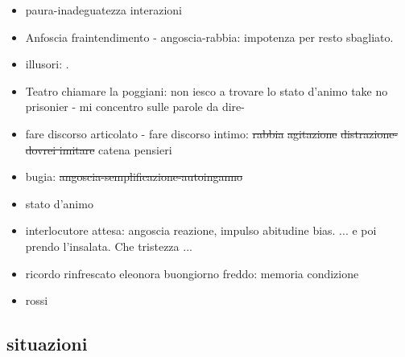 \begin{itemize}

\item paura-inadeguatezza interazioni

\item Anfoscia fraintendimento - angoscia-rabbia: impotenza per resto sbagliato.

\item {} illusori: .

\item Teatro chiamare la poggiani: non iesco a trovare lo stato d'animo take no prisonier - mi concentro sulle parole da dire- 

\item fare discorso articolato - fare discorso intimo: \sout{rabbia} \sout{agitazione} \sout{distrazione-dovrei imitare} catena pensieri

\item bugia: \sout{angoscia-semplificazione-autoinganno} 

\item stato d'animo 

\item interlocutore attesa: angoscia reazione, impulso abitudine bias. ... e poi prendo l'insalata. Che tristezza ...

\item ricordo rinfrescato eleonora buongiorno freddo: memoria condizione 

\item {} rossi

\end{itemize}


\subsection{situazioni}


